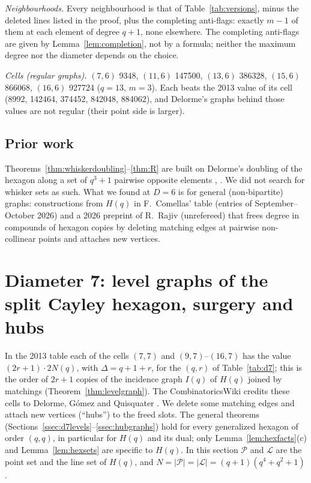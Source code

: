 \documentclass[11pt]{amsart}
\theoremstyle{definition}
\theoremstyle{remark}
\numberwithin{equation}{section}
\newcommand{\cL}{\mathcal L}
\newcommand{\cP}{\mathcal P}
\begin{document}
\emph{Neighbourhoods.} Every neighbourhood is that of Table~\ref{tab:versions}, minus the deleted lines listed in the
proof, plus the completing anti-flags: exactly $m-1$ of them at each element of degree $q+1$, none elsewhere. The
completing anti-flags are given by Lemma~\ref{lem:completion}, not by a formula; neither the maximum degree nor the
diameter depends on the choice.

\noindent\emph{Cells (regular graphs).} $(7,6)$ 9348, $(11,6)$ 147500, $(13,6)$ 386328, $(15,6)$ 866068, $(16,6)$ 927724
($q=13$, $m=3$). Each beats the 2013 value of its cell (8992, 142464, 374452, 842048, 884062), and Delorme's graphs behind
those values are not regular (their point side is larger).

\subsection{Prior work}
Theorems~\ref{thm:whiskerdoubling}--\ref{thm:R} are built on Delorme's doubling of the hexagon along a set of $q^3+1$
pairwise opposite elements \cite[\S8(b)]{D85a}, \cite{T80}. We did not search for whisker sets as such. What we found at
$D=6$ is for general (non-bipartite) graphs: constructions from $H(q)$ in F.~Comellas' table \cite{Co26} (entries of
September--October 2026) and a 2026 preprint of R.~Rajiv \cite{Ra26} (unrefereed) that frees degree in compounds of
hexagon copies by deleting matching edges at pairwise non-collinear points and attaches new vertices.

\section{Diameter 7: level graphs of the split Cayley hexagon, surgery and hubs}\label{sec:d7}

In the 2013 table each of the cells $(7,7)$ and $(9,7)$--$(16,7)$ has the value $(2r+1)\cdot2N(q)$, with
$\Delta=q+1+r$, for the $(q,r)$ of Table~\ref{tab:d7}; this is the order of $2r+1$ copies of the incidence graph $I(q)$ of
$H(q)$ joined by matchings (Theorem~\ref{thm:levelgraph}). The CombinatoricsWiki credits these cells to Delorme, G\'omez
and Quisquater \cite{DGQ}. We delete some matching edges and attach new vertices (``hubs'') to the freed slots. The
general theorems (Sections~\ref{ssec:d7levels}--\ref{ssec:hubgraphs}) hold for every generalized hexagon of order
$(q,q)$, in particular for $H(q)$ and its dual; only Lemma~\ref{lem:hexfacts}(c) and Lemma~\ref{lem:hexsets} are specific
to $H(q)$. In this section $\cP$ and $\cL$ are the point set and the line set of $H(q)$, and $N=|\cP|=|\cL|=(q+1)(q^4+q^2+1)$.
\end{document}
